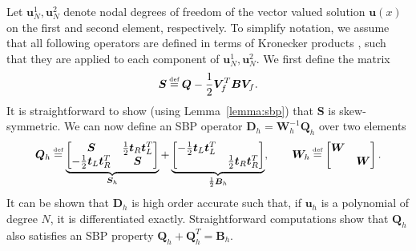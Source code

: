 \documentclass[review,onefignum,onetabnum,final]{siamart171218}
\newcommand\myeq{\mathrel{\stackrel{\makebox[0pt]{\mbox{\normalfont\tiny def}}}{=}}}
\begin{document}
Let $\bm{u}^1_N, \bm{u}^2_N$ denote nodal degrees of freedom of the vector valued solution $\bm{u}(x)$ on the first and second element, respectively.  To simplify notation, we assume that all following operators are defined in terms of Kronecker products \cite{chen2017entropy}, such that they are applied to each component of $\bm{u}^1_N, \bm{u}^2_N$.  
We first define the matrix 
\begin{equation}
\bm{S} \myeq \bm{Q} - \frac{1}{2}\bm{V}_f^T\bm{B}\bm{V}_f.
\label{eq:Smat}
\end{equation}
It is straightforward to show (using Lemma~\ref{lemma:sbp}) that $\bm{S}$ is skew-symmetric.  We can now define an SBP operator $\bm{D}_h = \bm{W}_h^{-1}\bm{Q}_h$ over two elements
\begin{equation}
\bm{Q}_{h} \myeq 
\underbrace{\begin{bmatrix}
\bm{S}  & \frac{1}{2}\bm{t}_R\bm{t}_L^T \\
- \frac{1}{2}\bm{t}_L\bm{t}_R^T & \bm{S}
\end{bmatrix}}_{\bm{S}_h}
+
\underbrace{\begin{bmatrix}
-\frac{1}{2}\bm{t}_L\bm{t}_L^T  & \\
 & \frac{1}{2} \bm{t}_R\bm{t}_R^T
\end{bmatrix}}_{\frac{1}{2}\bm{B}_h}
, \qquad 
\bm{W}_h \myeq \begin{bmatrix}\bm{W} &\\
& \bm{W}
\end{bmatrix}.
\label{eq:gsbp}
\end{equation}
It can be shown that $\bm{D}_h$ is high order accurate such that, if $\bm{u}_h$ is a polynomial of degree $N$, it is differentiated exactly.  Straightforward computations show that $\bm{Q}_h$ also satisfies an SBP property $\bm{Q}_h + \bm{Q}_h^T = \bm{B}_h$.
\end{document}
